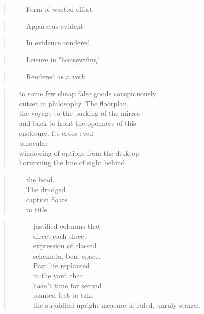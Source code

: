 \documentclass[
]{memoir}
\begin{document}
\begin{verse}
    Form of wasted effort\\
\end{verse}

\begin{verse}
    Apparatus evident\\
\end{verse}

\begin{verse}
    In evidence rendered\\
\end{verse}

\begin{verse}
    Leisure in "housewifing"\\
\end{verse}

\begin{verse}
    Rendered as a verb\\
\end{verse}

\begin{verse}
  to some few cheap false goods conspicuously\\
  outset in philosophy. The floorplan,\\
  the voyage to the backing of the mirror\\
  and back to front the openness of this\\
  enclosure. Its cross-eyed\\
  binocular\\
  windowing of options from the desktop\\
  horizoning the line of sight behind\\
\end{verse}

\begin{verse}
    the head.\\
    The drudged\\
    caption floats\\
    to title\\
\end{verse}

\begin{verse}
      justified columns that\\
      direct each direct\\
      expression of classed\\
      schemata, bent space.\\
      Past life replanted\\
      in the yard that\\
      hasn't time for second\\
      planted feet to take\\
      the straddled upright measure of ruled, unruly stance.\\
\end{verse}
\end{document}
